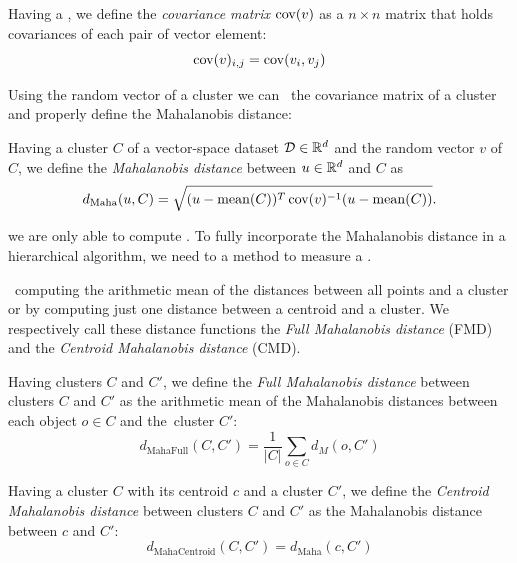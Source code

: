 \begin{defn}
	Having a , we define the \emph{covariance matrix} $\operatorname{cov}(v)$ as a $n\times n$ matrix that holds covariances of each pair of vector element:
	$$\operatorname{cov}(v)_{i,j}=\operatorname{cov}(v_i,v_j)$$
\end{defn}

Using the random vector of a cluster we can \ the covariance matrix of a cluster and properly define the Mahalanobis distance:

\begin{defn}
	Having a cluster $C$ of a vector-space dataset $\mathcal{D}\in\mathbb{R}^d$ and the random vector $v$ of $C$, we define the \emph{Mahalanobis distance} between $u \in \mathbb{R}^d$ and $C$ as
	\[d_\text{Maha}(u,C) = \sqrt{(u-\operatorname{mean}(C))^T\operatorname{cov}(v)^{-1}(u-\operatorname{mean}(C))}.\]
\end{defn}


 we are only able to compute . To fully incorporate the Mahalanobis distance in a hierarchical algorithm, we need to  a method  to measure a . 

\ computing the arithmetic mean of the distances between all points and a cluster or by computing just one distance between a centroid and a cluster. We respectively call these distance functions the \emph{Full Mahalanobis distance} (FMD) and the \emph{Centroid Mahalanobis distance} (CMD).

\begin{defn}
	Having clusters $C$ and $C'$, we define the \emph{Full Mahalanobis distance} between clusters $C$ and $C'$ as the arithmetic mean of the Mahalanobis distances between each object $o \in C$ and the~cluster $C'$:
	$$d_\text{MahaFull}(C,C') =\frac{1}{|C|}\sum_{o\in C}{d_M(o,C')}$$
	\label{def01:fmd}
\end{defn}

\begin{defn}
	Having a cluster $C$ with its centroid $c$ and a cluster $C'$, we define the \emph{Centroid Mahalanobis distance} between clusters $C$ and $C'$ as the Mahalanobis distance between $c$ and $C'$:
	$$d_\text{MahaCentroid}(C,C')=d_\text{Maha}(c,C')$$
	\label{def01:cmd}
\end{defn}


